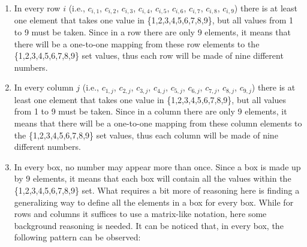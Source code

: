 \documentclass[]{usiinfprospectus}
\newcounter{row}
\newcounter{col}
\begin{document}
\begin{enumerate}[label={(\arabic*)}]
\item In every row $i$ (i.e., $c_{i,1}$, $c_{i,2}$, $c_{i,3}$, $c_{i,4}$, $c_{i,5}$, $c_{i,6}$, $c_{i,7}$, $c_{i,8}$, $c_{i,9}$) there is at least one element that takes one value in \{1,2,3,4,5,6,7,8,9\}, but all values from 1 to 9 must be taken. Since in a row there are only 9 elements, it means that there will be a one-to-one mapping from these row elements to the \{1,2,3,4,5,6,7,8,9\} set values, thus each row will be made of nine different numbers.
\item In every column $j$ (i.e., $c_{1,j}$, $c_{2,j}$, $c_{3,j}$, $c_{4,j}$, $c_{5,j}$, $c_{6,j}$, $c_{7,j}$, $c_{8,j}$, $c_{9,j}$) there is at least one element that takes one value in \{1,2,3,4,5,6,7,8,9\}, but all values from 1 to 9 must be taken. Since in a column there are only 9 elements, it means that there will be a one-to-one mapping from these column elements to the \{1,2,3,4,5,6,7,8,9\} set values, thus each column will be made of nine different numbers.
\item In every box, no number may appear more than once. Since a box is made up by 9 elements, it means that each box will contain all the values within the \{1,2,3,4,5,6,7,8,9\} set. What requires a bit more of reasoning here is finding a generalizing way to define all the elements in a box for every box. While for rows and columns it suffices to use a matrix-like notation, here some background reasoning is needed. It can be noticed that, in every box, the following pattern can be observed:
\begin{figure}[h]
\begin{center}
\end{center}
\end{figure}
\end{enumerate}
\end{document}
